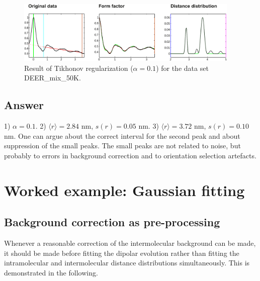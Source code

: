 \documentclass[11pt,a4paper]{article}
\begin{document}
\begin{figure}[ht]
 \vspace{10mm}
 	\begin{center}
		\includegraphics[width=0.95\textwidth]{figure6.pdf}
	\end{center}
	\caption{Result of Tikhonov regularization ($\alpha = 0.1$) for the data set {\ttfamily DEER\_mix\_50K}. }
	\label{fig:6}
\end{figure}
    
\subsection{Answer}

1) $\alpha = 0.1$. 2) $\langle r \rangle = 2.84$ nm, $s(r) = 0.05$ nm. 3) $\langle r \rangle = 3.72$ nm, $s(r) = 0.10$ nm. One can argue about the correct interval for the second peak and about suppression of the small peaks. The small peaks are not related to noise, but probably to errors in background correction and to orientation selection artefacts. 
    
\section{Worked example: Gaussian fitting}

\subsection{Background correction as pre-processing}

Whenever a reasonable correction of the intermolecular background can be made, it should be made before fitting the dipolar evolution rather than fitting the intramolecular and intermolecular distance distributions simultaneously. This is demonstrated in the following.
\end{document}

